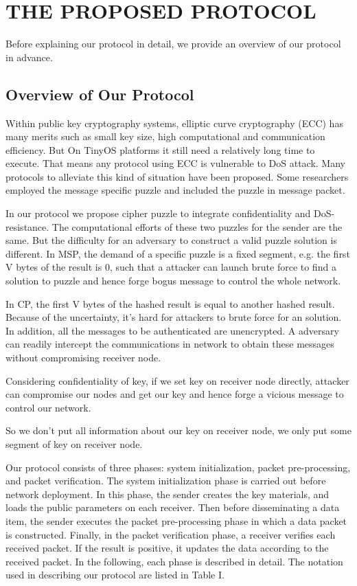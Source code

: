 \documentclass[10pt, conference, compsocconf]{IEEEtran}
\begin{document}
\section{THE PROPOSED PROTOCOL}
Before explaining our protocol in detail, we provide an overview of our protocol in advance.
\subsection{Overview of Our Protocol}
Within public key cryptography systems, elliptic curve cryptography (ECC) has many merits such as small key size, high computational and communication efficiency. But On TinyOS platforms it still need a relatively long time to execute.  That means any protocol using ECC is vulnerable to DoS attack. Many protocols to alleviate this kind of situation have been proposed. Some researchers employed the message specific puzzle and included the puzzle in message packet\cite{Msp}. 

In our protocol we propose cipher puzzle to integrate confidentiality and DoS-resistance. The computational efforts of these two puzzles for the sender are the same. But the difficulty for an adversary to construct a valid puzzle solution is different. In MSP, the demand of a specific puzzle is a fixed segment, e.g. the first V bytes of the result is 0, such that a attacker can launch brute force to find a solution to puzzle and hence forge bogus message to control the whole network.

In CP, the first V bytes of the hashed result is equal to another hashed result. Because of the uncertainty, it's hard for attackers to brute force for an solution. In addition, all the messages to be authenticated are unencrypted. A adversary can readily intercept the communications in network to obtain these messages without compromising receiver node.

Considering confidentiality of key, if we set key on receiver node directly, attacker can compromise our nodes and get our key and hence forge a vicious message to control our network.

So we don't put all information about our key on receiver node, we only put some segment of key on receiver node. 

Our protocol consists of three phases: system initialization, packet pre-processing, and packet verification. The system initialization phase is carried out before network deployment. In this phase, the sender creates the key materials, and loads the public parameters on each receiver. Then before disseminating a data item, the sender executes the packet pre-processing phase in which a data packet is constructed. Finally, in the packet verification phase, a receiver verifies each received packet. If the result is positive, it updates the data according to the received packet. In the following, each phase is described in detail. The notation used in describing our protocol are listed in Table I.
\end{document}
